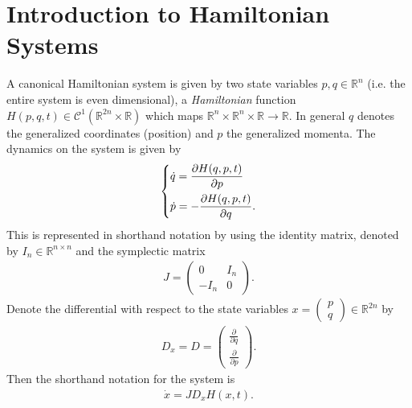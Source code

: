 \chapter{Introduction to Hamiltonian Systems}
A canonical Hamiltonian system is given by two state variables $p,q \in \mathbb{R}^{n}$ (i.e. the entire system is even dimensional), a \emph{Hamiltonian} function $H(p,q,t)\in \mathcal{C}^{1}(\mathbb{R}^{2n}\times \mathbb{\mathbb{R}})$ which maps $\mathbb{R}^{n}\times\mathbb{R}^{n}\times\mathbb{R}\to \mathbb{R}$. In general $q$ denotes the generalized coordinates (position) and $p$ the generalized momenta. The dynamics on the system is given by
\begin{align}
	\begin{dcases}
		\dot{q} = \frac{\partial H(q,p,t)}{\partial p}\\
		\dot{p} = - \frac{\partial H(q,p,t)}{\partial q}.
	\end{dcases}
\end{align}
This is represented in shorthand notation by using the identity matrix, denoted by $I_{n}\in\mathbb{R}^{n\times n}$ and the symplectic matrix
\begin{align}
	J = 
	\begin{pmatrix}
		0 & I_{n}\\
		-I_{n} & 0
	\end{pmatrix}
.	
\end{align}
Denote the differential with respect to the state variables $x =
\begin{pmatrix}
	p \\ q
\end{pmatrix}
\in \mathbb{R}^{2n}$ by
\begin{align}
	D_{x} = D = 
	\begin{pmatrix}
		\frac{\partial}{\partial q} \\
		\frac{\partial}{\partial p}
	\end{pmatrix}
.	
\end{align}
Then the shorthand notation for the system is
\begin{align}
	\boxed{
	\dot{x} = JD_{x}H(x,t).
}
\end{align}

